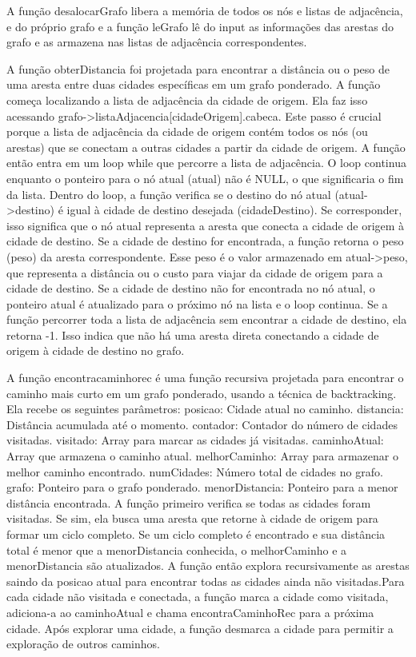 \documentclass{article}
\begin{document}
A função desalocarGrafo libera a memória de todos os nós e listas de adjacência, e do próprio grafo e a função leGrafo lê do input as informações das arestas do grafo e as armazena nas listas de adjacência correspondentes.

A função obterDistancia foi projetada para encontrar a distância ou o peso de uma aresta entre duas cidades específicas em um grafo ponderado. A função começa localizando a lista de adjacência da cidade de origem. Ela faz isso acessando grafo-\textgreater listaAdjacencia[cidadeOrigem].cabeca. Este passo é crucial porque a lista de adjacência da cidade de origem contém todos os nós (ou arestas) que se conectam a outras cidades a partir da cidade de origem. A função então entra em um loop while que percorre a lista de adjacência. O loop continua enquanto o ponteiro para o nó atual (atual) não é NULL, o que significaria o fim da lista. Dentro do loop, a função verifica se o destino do nó atual (atual-\textgreater destino) é igual à cidade de destino desejada (cidadeDestino). Se corresponder, isso significa que o nó atual representa a aresta que conecta a cidade de origem à cidade de destino.
Se a cidade de destino for encontrada, a função retorna o peso (peso) da aresta correspondente. Esse peso é o valor armazenado em atual-\textgreater peso, que representa a distância ou o custo para viajar da cidade de origem para a cidade de destino. Se a cidade de destino não for encontrada no nó atual, o ponteiro atual é atualizado para o próximo nó na lista e o loop continua.
Se a função percorrer toda a lista de adjacência sem encontrar a cidade de destino, ela retorna -1. Isso indica que não há uma aresta direta conectando a cidade de origem à cidade de destino no grafo.

A função encontracaminhorec é uma função recursiva projetada para encontrar o caminho mais curto em um grafo ponderado, usando a técnica de backtracking. Ela recebe os seguintes parâmetros: posicao: Cidade atual no caminho.
distancia: Distância acumulada até o momento.
contador: Contador do número de cidades visitadas.
visitado: Array para marcar as cidades já visitadas.
caminhoAtual: Array que armazena o caminho atual.
melhorCaminho: Array para armazenar o melhor caminho encontrado.
numCidades: Número total de cidades no grafo.
grafo: Ponteiro para o grafo ponderado.
menorDistancia: Ponteiro para a menor distância encontrada.
A função primeiro verifica se todas as cidades foram visitadas. Se sim, ela busca uma aresta que retorne à cidade de origem para formar um ciclo completo. Se um ciclo completo é encontrado e sua distância total é menor que a menorDistancia conhecida, o melhorCaminho e a menorDistancia são atualizados. A função então explora recursivamente as arestas saindo da posicao atual para encontrar todas as cidades ainda não visitadas.Para cada cidade não visitada e conectada, a função marca a cidade como visitada, adiciona-a ao caminhoAtual e chama encontraCaminhoRec para a próxima cidade. Após explorar uma cidade, a função desmarca a cidade para permitir a exploração de outros caminhos.
\end{document}
